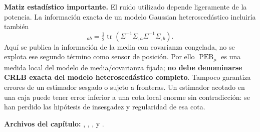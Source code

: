 \textbf{Matiz estadístico importante.} El ruido utilizado depende ligeramente de la potencia. La información exacta de un modelo Gaussian heteroscedástico incluiría también
\begin{equation}
[F_{\Sigma}]_{ab}=\tfrac12\operatorname{tr}(\Sigma^{-1}\Sigma_{,a}\Sigma^{-1}\Sigma_{,b}).
\end{equation}
Aquí se publica la información de la media con covarianza congelada, no se explota ese segundo término como sensor de posición. Por ello $\operatorname{PEB}_\mu$ es una medida local del modelo de media/covarianza fijada; \textbf{no debe denominarse CRLB exacta del modelo heteroscedástico completo}. Tampoco garantiza errores de un estimador sesgado o sujeto a fronteras. Un estimador acotado en una caja puede tener error inferior a una cota local enorme sin contradicción: se han perdido las hipótesis de insesgadez y regularidad de esa cota.

\textbf{Archivos del capítulo:} , , ,  y .
